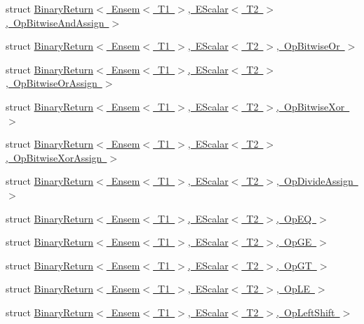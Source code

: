 \begin{DoxyCompactItemize}
\item 
struct \mbox{\hyperlink{structENSEM_1_1BinaryReturn_3_01Ensem_3_01T1_01_4_00_01EScalar_3_01T2_01_4_00_01OpBitwiseAndAssign_01_4}{Binary\+Return$<$ Ensem$<$ T1 $>$, E\+Scalar$<$ T2 $>$, Op\+Bitwise\+And\+Assign $>$}}
\item 
struct \mbox{\hyperlink{structENSEM_1_1BinaryReturn_3_01Ensem_3_01T1_01_4_00_01EScalar_3_01T2_01_4_00_01OpBitwiseOr_01_4}{Binary\+Return$<$ Ensem$<$ T1 $>$, E\+Scalar$<$ T2 $>$, Op\+Bitwise\+Or $>$}}
\item 
struct \mbox{\hyperlink{structENSEM_1_1BinaryReturn_3_01Ensem_3_01T1_01_4_00_01EScalar_3_01T2_01_4_00_01OpBitwiseOrAssign_01_4}{Binary\+Return$<$ Ensem$<$ T1 $>$, E\+Scalar$<$ T2 $>$, Op\+Bitwise\+Or\+Assign $>$}}
\item 
struct \mbox{\hyperlink{structENSEM_1_1BinaryReturn_3_01Ensem_3_01T1_01_4_00_01EScalar_3_01T2_01_4_00_01OpBitwiseXor_01_4}{Binary\+Return$<$ Ensem$<$ T1 $>$, E\+Scalar$<$ T2 $>$, Op\+Bitwise\+Xor $>$}}
\item 
struct \mbox{\hyperlink{structENSEM_1_1BinaryReturn_3_01Ensem_3_01T1_01_4_00_01EScalar_3_01T2_01_4_00_01OpBitwiseXorAssign_01_4}{Binary\+Return$<$ Ensem$<$ T1 $>$, E\+Scalar$<$ T2 $>$, Op\+Bitwise\+Xor\+Assign $>$}}
\item 
struct \mbox{\hyperlink{structENSEM_1_1BinaryReturn_3_01Ensem_3_01T1_01_4_00_01EScalar_3_01T2_01_4_00_01OpDivideAssign_01_4}{Binary\+Return$<$ Ensem$<$ T1 $>$, E\+Scalar$<$ T2 $>$, Op\+Divide\+Assign $>$}}
\item 
struct \mbox{\hyperlink{structENSEM_1_1BinaryReturn_3_01Ensem_3_01T1_01_4_00_01EScalar_3_01T2_01_4_00_01OpEQ_01_4}{Binary\+Return$<$ Ensem$<$ T1 $>$, E\+Scalar$<$ T2 $>$, Op\+E\+Q $>$}}
\item 
struct \mbox{\hyperlink{structENSEM_1_1BinaryReturn_3_01Ensem_3_01T1_01_4_00_01EScalar_3_01T2_01_4_00_01OpGE_01_4}{Binary\+Return$<$ Ensem$<$ T1 $>$, E\+Scalar$<$ T2 $>$, Op\+G\+E $>$}}
\item 
struct \mbox{\hyperlink{structENSEM_1_1BinaryReturn_3_01Ensem_3_01T1_01_4_00_01EScalar_3_01T2_01_4_00_01OpGT_01_4}{Binary\+Return$<$ Ensem$<$ T1 $>$, E\+Scalar$<$ T2 $>$, Op\+G\+T $>$}}
\item 
struct \mbox{\hyperlink{structENSEM_1_1BinaryReturn_3_01Ensem_3_01T1_01_4_00_01EScalar_3_01T2_01_4_00_01OpLE_01_4}{Binary\+Return$<$ Ensem$<$ T1 $>$, E\+Scalar$<$ T2 $>$, Op\+L\+E $>$}}
\item 
struct \mbox{\hyperlink{structENSEM_1_1BinaryReturn_3_01Ensem_3_01T1_01_4_00_01EScalar_3_01T2_01_4_00_01OpLeftShift_01_4}{Binary\+Return$<$ Ensem$<$ T1 $>$, E\+Scalar$<$ T2 $>$, Op\+Left\+Shift $>$}}

\end{DoxyCompactItemize}
